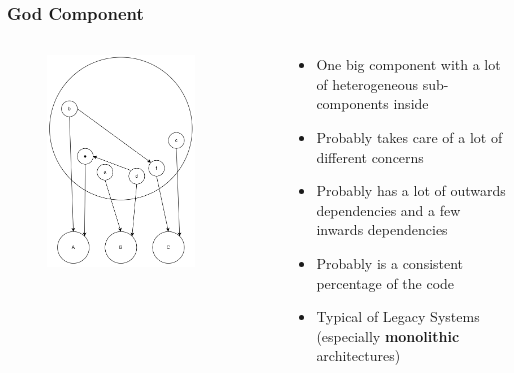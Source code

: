 \documentclass[dvipsnames, 10pt]{beamer}
\begin{document}
\begin{frame}
  \frametitle{God Component}
  \begin{columns}
    \begin{column}{0.5\textwidth}
      \begin{figure}
        \begin{center}
          \includegraphics[width=0.8\textwidth]{figures/architectural-smells/god-component.png}
        \end{center}
      \end{figure}
    \end{column}
    \begin{column}{0.5\textwidth}
      \begin{itemize}
        \item One big component with a lot of heterogeneous sub-components inside
        \item Probably takes care of a lot of different concerns
        \item Probably has a lot of outwards dependencies and a few inwards dependencies
        \item Probably is a consistent percentage of the code
        \item Typical of Legacy Systems (especially \textbf{monolithic} architectures)
      \end{itemize}
    \end{column}
  \end{columns}
\end{frame}
\end{document}
